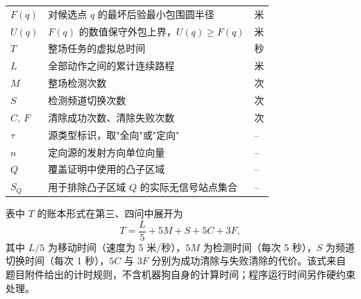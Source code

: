\begin{table}[H]
\begin{tabularx}{\textwidth}{C{0.16\textwidth}ZC{0.20\textwidth}}
    $F(q)$ & 对候选点 $q$ 的最坏后验最小包围圆半径 & 米 \\
    $U(q)$ & $F(q)$ 的数值保守外包上界，$U(q)\ge F(q)$ & 米 \\
    $T$ & 整场任务的虚拟总时间 & 秒 \\
    $L$ & 全部动作之间的累计连续路程 & 米 \\
    $M$ & 整场检测次数 & 次 \\
    $S$ & 检测频道切换次数 & 次 \\
    $C,\ F$ & 清除成功次数、清除失败次数 & 次 \\
    $\tau$ & 源类型标识，取"全向"或"定向" & -- \\
    $n$ & 定向源的发射方向单位向量 & -- \\
    $Q$ & 覆盖证明中使用的凸子区域 & -- \\
    $S_Q$ & 用于排除凸子区域 $Q$ 的实际无信号站点集合 & -- \\
    \bottomrule[1.2pt]
  \end{tabularx}
  \endgroup
\end{table}

表中 $T$ 的账本形式在第三、四问中展开为
\begin{equation}
  T=\frac{L}{5}+5M+S+5C+3F ,
  \label{eq:time-ledger}
\end{equation}
其中 $L/5$ 为移动时间（速度为 5 米/秒），$5M$ 为检测时间（每次 5 秒），$S$ 为频道切换时间（每次 1 秒），$5C$ 与 $3F$ 分别为成功清除与失败清除的代价。该式来自题目附件给出的计时规则，不含机器狗自身的计算时间；程序运行时间另作硬约束处理。
